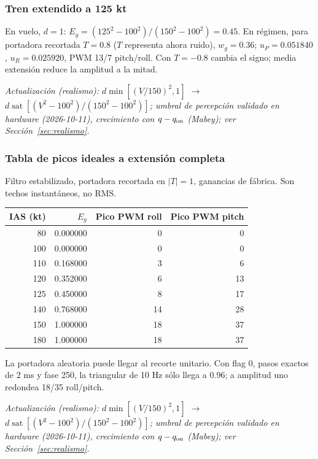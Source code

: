 \documentclass[11pt,a4paper]{article}
\newcommand{\sat}{\operatorname{sat}}
\begin{document}
\subsubsection{Tren extendido a 125 kt}
En vuelo, $d=1$: $E_g=(125^2-100^2)/(150^2-100^2)=0.45$. En régimen, para portadora recortada $T=0.8$ ($T$ representa ahora ruido), $w_g=0.36$; $u_P=0.051840$, $u_R=0.025920$, PWM 13/7 pitch/roll. Con $T=-0.8$ cambia el signo; media extensión reduce la amplitud a la mitad.

\textit{Actualización (realismo): $d\min[(V/150)^2,1]$ $\rightarrow$ $d\sat[(V^2-100^2)/(150^2-100^2)]$; umbral de percepción validado en hardware (2026-10-11), crecimiento con $q-q_{\rm on}$ (Mabey); ver Sección~\ref{sec:realismo}.}

\subsubsection{Tabla de picos ideales a extensión completa}
Filtro estabilizado, portadora recortada en $|T|=1$, ganancias de fábrica. Son techos instantáneos, no RMS.
\begin{center}\begin{tabular}{rrrr}
\toprule IAS (kt)&$E_g$&Pico PWM roll&Pico PWM pitch\\\midrule
80&0.000000&0&0\\
100&0.000000&0&0\\
110&0.168000&3&6\\
120&0.352000&6&13\\
125&0.450000&8&17\\
140&0.768000&14&28\\
150&1.000000&18&37\\
180&1.000000&18&37\\
\bottomrule\end{tabular}\end{center}
La portadora aleatoria puede llegar al recorte unitario. Con flag 0, pasos exactos de 2 ms y fase 250, la triangular de 10 Hz sólo llega a 0.96; a amplitud uno redondea 18/35 roll/pitch.

\textit{Actualización (realismo): $d\min[(V/150)^2,1]$ $\rightarrow$ $d\sat[(V^2-100^2)/(150^2-100^2)]$; umbral de percepción validado en hardware (2026-10-11), crecimiento con $q-q_{\rm on}$ (Mabey); ver Sección~\ref{sec:realismo}.}
\end{document}
